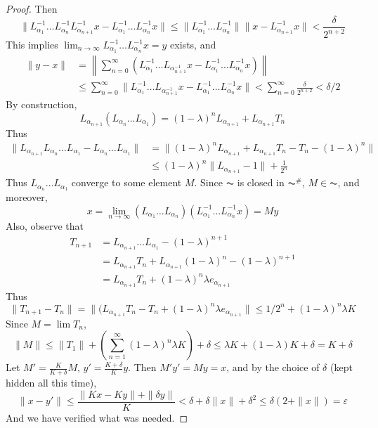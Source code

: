 \begin{proof}
    Then
    \[ \| L_{\alpha_1}^{-1} \dots L_{\alpha_n}^{-1} L_{\alpha_{n+1}}^{-1} x - L_{\alpha_1}^{-1} \dots L_{\alpha_n}^{-1} x \| \leq \| L_{\alpha_1}^{-1} \dots L_{\alpha_n}^{-1} \| \| x - L_{\alpha_{n+1}}^{-1} x \| < \frac{\delta}{2^{n+2}} \]
    This implies $\lim_{n \to \infty} L_{\alpha_1}^{-1} \dots L_{\alpha_n}^{-1} x = y$ exists, and
    \begin{align*}
    \| y - x \| &= \left\| \sum_{n = 0}^\infty (L_{\alpha_1}^{-1} \dots L_{\alpha_{n+1}^{-1}} x - L_{\alpha_1}^{-1} \dots L_{\alpha_n}^{-1} x) \right\|\\
    &\leq \sum_{n = 0}^\infty \| L_{\alpha_1}^{-1} \dots L_{\alpha_{n+1}^{-1}} x - L_{\alpha_1}^{-1} \dots L_{\alpha_n}^{-1} x \| < \sum_{n = 0}^\infty \frac{\delta}{2^{n+2}} < \delta/2
    \end{align*}
    By construction,
    \[ L_{\alpha_{n+1}} (L_{\alpha_n} \dots L_{\alpha_1}) = (1 - \lambda)^n L_{\alpha_{n+1}} + L_{\alpha_{n+1}} T_n \]
    Thus
    \begin{align*}
        \| L_{\alpha_{n+1}} L_{\alpha_n} \dots L_{\alpha_1} - L_{\alpha_n} \dots L_{\alpha_1} \| &= \| (1 - \lambda)^n L_{\alpha_{n+1}} + L_{\alpha_{n+1}} T_n - T_n - (1-  \lambda)^n \|\\
        &\leq (1 - \lambda)^n \| L_{\alpha_{n+1}} - 1 \| + \frac{1}{2^n}
    \end{align*}
    Thus $L_{\alpha_n} \dots L_{\alpha_1}$ converge to some element $M$. Since $\AC$ is closed in $\AC^\#$, $M \in \AC$, and moreover,
    \[ x = \lim_{n \to \infty} (L_{\alpha_1} \dots L_{\alpha_n}) (L_{\alpha_1}^{-1} \dots L_{\alpha_n}^{-1} x) = My \]
    Also, observe that
    \begin{align*}
        T_{n+1} &= L_{\alpha_{n+1}} \dots L_{\alpha_1} - (1 - \lambda)^{n+1}\\
        &= L_{\alpha_{n+1}} T_n + L_{\alpha_{n+1}} (1 - \lambda)^n - (1 - \lambda)^{n+1}\\
        &= L_{\alpha_{n+1}} T_n + (1 - \lambda)^n \lambda e_{\alpha_{n+1}}
    \end{align*}
    Thus
    \[ \| T_{n+1} - T_n \| = \| (L_{\alpha_{n+1}} T_n - T_n + (1 - \lambda)^n \lambda e_{\alpha_{n+1}} \| \leq 1/2^n + (1 - \lambda)^n \lambda K \]
    Since $M = \lim T_n$,
    \[ \| M \| \leq \| T_1 \| + \left(\sum_{n = 1}^\infty (1 - \lambda)^n \lambda K \right) + \delta \leq \lambda K + (1 - \lambda) K + \delta = K + \delta \]
    Let $M' = \frac{K}{K + \delta} M$, $y' = \frac{K + \delta}{K} y$. Then $M'y' = My = x$, and by the choice of $\delta$ (kept hidden all this time),
    \[ \| x - y' \| \leq \frac{\| Kx - Ky \| + \| \delta y \|}{K} < \delta + \delta \| x \| + \delta^2 \leq \delta(2 + \|x\|) = \varepsilon \]
    And we have verified what was needed.
\end{proof}

